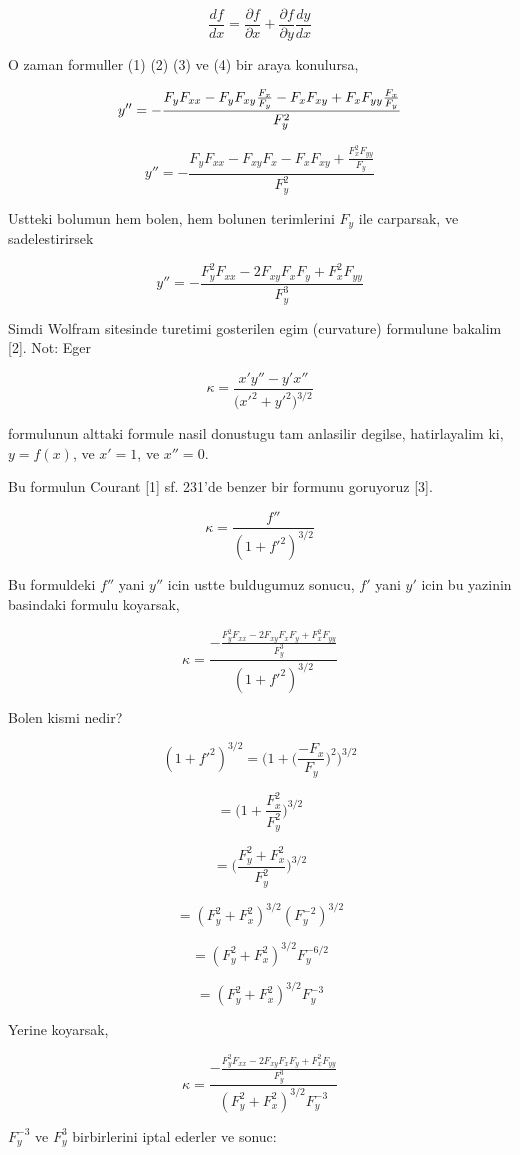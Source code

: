 \documentclass[12pt,fleqn]{article}\usepackage{../common}
\begin{document}
\[ \frac{df}{dx} = \frac{\partial f}{\partial x} + \frac{\partial f}{\partial y} \frac{dy}{dx}  \]

O zaman formuller (1) (2) (3) ve (4) bir araya konulursa,

\[ y '' = - \frac{F_yF_{xx} - F_y F_{xy}\frac{F_x}{F_y} - F_xF_{xy} + F_xF_{yy}\frac{F_x}{F_y}}{F_y^2}\\ \]

\[ y '' = - \frac{F_yF_{xx} - F_{xy}F_x - F_xF_{xy} + \frac{F_x^2F_{yy}}{F_y}}{F_y^2} \]

Ustteki bolumun hem bolen, hem bolunen terimlerini $F_y$ ile carparsak, ve
sadelestirirsek

\[ y '' = - \frac{F_y^2F_{xx} - 2F_{xy}F_xF_y + F_x^2F_{yy}}{F_y^3} \]

Simdi Wolfram sitesinde turetimi gosterilen egim (curvature) formulune
bakalim [2]. Not: Eger 

\[ \kappa = \frac{x'y''-y'x''}{\bigg(x'^2 + y'^2 \bigg)^{3/2}} \]

formulunun alttaki formule nasil donustugu tam anlasilir degilse, hatirlayalim ki,
$y=f(x)$, ve $x'=1$, ve $x'' = 0$. 

Bu formulun Courant [1] sf. 231'de benzer bir formunu goruyoruz [3]. 

\[ \kappa = \frac{f''}{(1+f'^2)^{3/2}} \]

Bu formuldeki $f''$ yani $y''$ icin ustte buldugumuz sonucu, $f'$ yani $y'$ icin
bu yazinin basindaki formulu koyarsak,

\[ 
\kappa = \frac
{-\frac
{\displaystyle F_y^2F_{xx} - 2F_{xy}F_xF_y +  F_x^2F_{yy}}{\displaystyle F_y^3}}
{(1+f'^2)^{3/2}} 
\]  

Bolen kismi nedir?

\[ (1+f'^2)^{3/2} = \bigg( 1 + \bigg(\frac{-F_x}{F_y}\bigg)^2 \bigg)^{3/2}  \]

\[ = \bigg( 1 + \frac{F_x^2}{F_y^2} \bigg)^{3/2}  \]

\[ = \bigg( \frac{F_y^2 + F_x^2}{F_y^2} \bigg)^{3/2}  \]

\[ = (F_y^2 + F_x^2)^{3/2}(F_y^{-2})^{3/2}  \]

\[ = (F_y^2 + F_x^2)^{3/2}F_y^{-6/2}  \]

\[ = (F_y^2 + F_x^2)^{3/2}F_y^{-3} \]

Yerine koyarsak,

\[ 
\kappa = \frac{\displaystyle
- \frac{F_y^2F_{xx} - 2F_{xy}F_xF_y + F_x^2F_{yy}}{F_y^3}}
{(F_y^2 + F_x^2)^{3/2}F_y^{-3}}
 \]

$F_y^{-3}$ ve $F_y^{3}$ birbirlerini iptal ederler ve sonuc:
\end{document}
